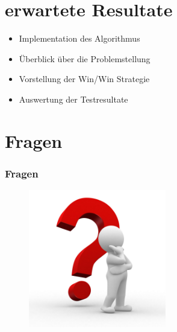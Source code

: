 \documentclass[12pt]{beamer}
\begin{document}
	\section{erwartete Resultate}
	\begin{frame}
		\begin{itemize}
			\item Implementation des Algorithmus
			\item Überblick über die Problemstellung
			\item Vorstellung der Win/Win Strategie
			\item Auswertung der Testresultate
		\end{itemize}
    \end{frame}

	\section{Fragen}
	\begin{frame}
		\frametitle{Fragen}
		\begin{figure}[H]
		\centering
			\includegraphics[width=6cm]{gfx/questionmark}
		\end{figure}
	\end{frame}
\end{document}
